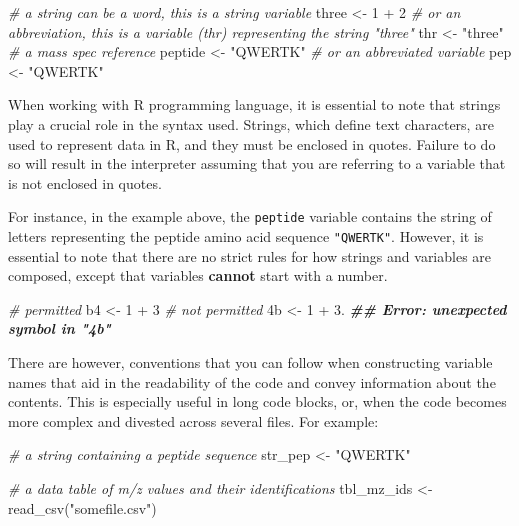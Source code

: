 \documentclass[
]{book}
\newenvironment{Shaded}{\begin{snugshade}}{\end{snugshade}}
\newcommand{\CommentTok}[1]{\textcolor[rgb]{0.56,0.35,0.01}{\textit{#1}}}
\newcommand{\DecValTok}[1]{\textcolor[rgb]{0.00,0.00,0.81}{#1}}
\newcommand{\DocumentationTok}[1]{\textcolor[rgb]{0.56,0.35,0.01}{\textbf{\textit{#1}}}}
\newcommand{\FloatTok}[1]{\textcolor[rgb]{0.00,0.00,0.81}{#1}}
\newcommand{\FunctionTok}[1]{\textcolor[rgb]{0.00,0.00,0.00}{#1}}
\newcommand{\NormalTok}[1]{#1}
\newcommand{\OtherTok}[1]{\textcolor[rgb]{0.56,0.35,0.01}{#1}}
\newcommand{\SpecialCharTok}[1]{\textcolor[rgb]{0.00,0.00,0.00}{#1}}
\newcommand{\StringTok}[1]{\textcolor[rgb]{0.31,0.60,0.02}{#1}}
\begin{document}
\begin{Shaded}
\begin{Highlighting}[]
\CommentTok{\# a string can be a word, this is a string variable}
\NormalTok{three }\OtherTok{\textless{}{-}} \DecValTok{1} \SpecialCharTok{+} \DecValTok{2}
\CommentTok{\# or an abbreviation, this is a variable (thr) representing the string "three"}
\NormalTok{thr }\OtherTok{\textless{}{-}} \StringTok{"three"} 
\CommentTok{\# a mass spec reference}
\NormalTok{peptide }\OtherTok{\textless{}{-}} \StringTok{"QWERTK"}
\CommentTok{\# or an abbreviated variable}
\NormalTok{pep }\OtherTok{\textless{}{-}} \StringTok{"QWERTK"}
\end{Highlighting}
\end{Shaded}

When working with R programming language, it is essential to note that strings play a crucial role in the syntax used. Strings, which define text characters, are used to represent data in R, and they must be enclosed in quotes. Failure to do so will result in the interpreter assuming that you are referring to a variable that is not enclosed in quotes.

For instance, in the example above, the \texttt{peptide} variable contains the string of letters representing the peptide amino acid sequence \texttt{"QWERTK"}. However, it is essential to note that there are no strict rules for how strings and variables are composed, except that variables \textbf{cannot} start with a number.

\begin{Shaded}
\begin{Highlighting}[]
\CommentTok{\# permitted}
\NormalTok{b4 }\OtherTok{\textless{}{-}} \DecValTok{1} \SpecialCharTok{+} \DecValTok{3}
\CommentTok{\# not permitted}
\NormalTok{4b }\OtherTok{\textless{}{-}} \DecValTok{1} \SpecialCharTok{+} \FloatTok{3.} \DocumentationTok{\#\# Error: unexpected symbol in "4b"}
\end{Highlighting}
\end{Shaded}

There are however, conventions that you can follow when constructing variable names that aid in the readability of the code and convey information about the contents. This is especially useful in long code blocks, or, when the code becomes more complex and divested across several files. For example:

\begin{Shaded}
\begin{Highlighting}[]
\CommentTok{\# a string containing a peptide sequence}
\NormalTok{str\_pep }\OtherTok{\textless{}{-}} \StringTok{"QWERTK"}

\CommentTok{\# a data table of m/z values and their identifications}
\NormalTok{tbl\_mz\_ids }\OtherTok{\textless{}{-}} \FunctionTok{read\_csv}\NormalTok{(}\StringTok{"somefile.csv"}\NormalTok{)}
\end{Highlighting}
\end{Shaded}
\end{document}
